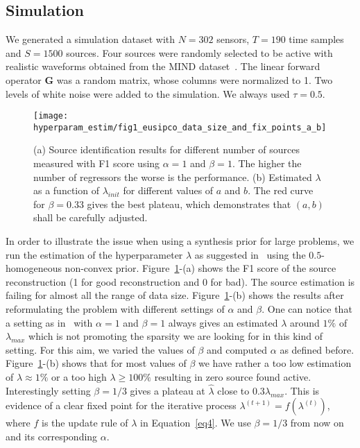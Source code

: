 \subsection{Simulation}

We generated a simulation dataset with $N=302$ sensors, $T=190$ time samples and $S=1500$ sources. Four sources were randomly selected to be active with realistic waveforms obtained from the MIND dataset~\cite{weisend2007paving}. The linear forward operator $\mathbf{G}$ was a random matrix, whose columns were normalized to 1. Two levels of white noise were added to the simulation. We always used $\tau=0.5$.

\begin{figure}
	\texttt{[image: hyperparam\_estim/fig1\_eusipco\_data\_size\_and\_fix\_points\_a\_b]}
    \caption{(a) Source identification results for different number of sources measured with F1 score using $\alpha=1$ and $\beta=1$. The higher the number of regressors the worse is the performance. (b) Estimated $\lambda$ as a function of $\lambda_{init}$ for different values of $a$ and $b$. The red curve for $\beta=0.33$ gives the best plateau, which demonstrates that $(a,b)$ shall be carefully adjusted.
    }
    \label{fig:fig1}
\end{figure}

In order to illustrate the issue when using a synthesis prior for large problems, we run the estimation of the hyperparameter $\lambda$ as suggested in~\cite{Figueiredo} using the $0.5$-homogeneous non-convex prior. Figure~\ref{fig:fig1}-(a) shows the F1 score of the source reconstruction (1 for good reconstruction and 0 for bad). The source estimation is failing for almost all the range of data size. Figure~\ref{fig:fig1}-(b) shows the results after reformulating the problem with different settings of $\alpha$ and $\beta$. One can notice that a setting as in~\cite{Figueiredo} with $\alpha=1$ and $\beta=1$ always gives an estimated $\lambda$ around $1\%$ of $\lambda_{max}$ which is not promoting the sparsity we are looking for in this kind of setting. For this aim, we varied the values of $\beta$ and computed $\alpha$ as defined before. Figure~\ref{fig:fig1}-(b) shows that for most values of $\beta$ we have rather a too low estimation of $\lambda\approx 1\%$ or a too high $\lambda\geq 100\%$ resulting in zero source found active. Interestingly setting $\beta=1/3$ gives a plateau at $\hat{\lambda}$ close to $0.3\lambda_{max}$. This is evidence of a clear fixed point for the iterative process $\lambda^{(t+1)}=f(\lambda^{(t)})$, where $f$ is the update rule of $\lambda$ in Equation~\eqref{eq4}. We use $\beta=1/3$ from now on and its corresponding $\alpha$.

